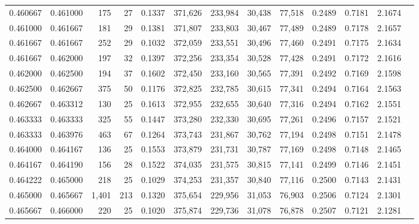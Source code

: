 \begin{tabular}{rrrrrrrrrrrrr}
0.460667 & 0.461000 &   175 &  27 &                                     0.1337 & 371,626 & 233,984 &  30,438 &  77,518 & 0.2489 & 0.7181 & 2.1674 \\
0.461000 & 0.461667 &   181 &  29 &                                     0.1381 & 371,807 & 233,803 &  30,467 &  77,489 & 0.2489 & 0.7178 & 2.1657 \\
0.461667 & 0.461667 &   252 &  29 &                                     0.1032 & 372,059 & 233,551 &  30,496 &  77,460 & 0.2491 & 0.7175 & 2.1634 \\
0.461667 & 0.462000 &   197 &  32 &                                     0.1397 & 372,256 & 233,354 &  30,528 &  77,428 & 0.2491 & 0.7172 & 2.1616 \\
0.462000 & 0.462500 &   194 &  37 &                                     0.1602 & 372,450 & 233,160 &  30,565 &  77,391 & 0.2492 & 0.7169 & 2.1598 \\
0.462500 & 0.462667 &   375 &  50 &                                     0.1176 & 372,825 & 232,785 &  30,615 &  77,341 & 0.2494 & 0.7164 & 2.1563 \\
0.462667 & 0.463312 &   130 &  25 &                                     0.1613 & 372,955 & 232,655 &  30,640 &  77,316 & 0.2494 & 0.7162 & 2.1551 \\
0.463333 & 0.463333 &   325 &  55 &                                     0.1447 & 373,280 & 232,330 &  30,695 &  77,261 & 0.2496 & 0.7157 & 2.1521 \\
0.463333 & 0.463976 &   463 &  67 &                                     0.1264 & 373,743 & 231,867 &  30,762 &  77,194 & 0.2498 & 0.7151 & 2.1478 \\
0.464000 & 0.464167 &   136 &  25 &                                     0.1553 & 373,879 & 231,731 &  30,787 &  77,169 & 0.2498 & 0.7148 & 2.1465 \\
0.464167 & 0.464190 &   156 &  28 &                                     0.1522 & 374,035 & 231,575 &  30,815 &  77,141 & 0.2499 & 0.7146 & 2.1451 \\
0.464222 & 0.465000 &   218 &  25 &                                     0.1029 & 374,253 & 231,357 &  30,840 &  77,116 & 0.2500 & 0.7143 & 2.1431 \\
0.465000 & 0.465667 & 1,401 & 213 &                                     0.1320 & 375,654 & 229,956 &  31,053 &  76,903 & 0.2506 & 0.7124 & 2.1301 \\
0.465667 & 0.466000 &   220 &  25 &                                     0.1020 & 375,874 & 229,736 &  31,078 &  76,878 & 0.2507 & 0.7121 & 2.1281 \\

\end{tabular}
